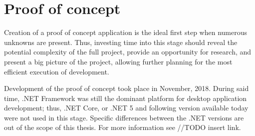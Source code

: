 \chapter{Proof of concept}

Creation of a proof of concept application is the ideal first step when numerous unknowns are present. Thus, investing time into this stage should reveal the potential complexity of the full project, provide an opportunity for research, and present a big picture of the project, allowing further planning for the most efficient execution of development.

Development of the proof of concept took place in November, 2018. During said time, .NET Framework was still the dominant platform for desktop application development; thus, .NET Core, or .NET 5 and following version available today were not used in this stage. Specific differences between the .NET versions are out of the scope of this thesis. For more information see //TODO insert link.